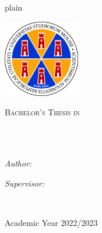 \documentclass[
11pt, %
oneside, %
british, %
doublespacing, %
headsepline,
]{MastersDoctoralThesis} %
\author{Marco \textsc{Omicini}} %
\begin{document}
\renewenvironment{abstract}

\frontmatter %

\pagestyle{plain} %

\begin{titlepage}
	\begin{center}
		\vspace{.06\textheight}
		{\scshape\LARGE \univname\par}\vspace{0.5cm} %
		{\scshape\large \deptname\par}\vspace{1cm} %
		\includegraphics[width=0.25\textwidth]{figs/logo} %
		\vspace{1cm}

		\textsc{\Large Bachelor's Thesis in \degreename}\\[0.5cm] %

		\HRule \\[0.2cm] %
		{\huge \bfseries \ttitle\par}\vspace{0.2cm} %
		\HRule \\[1.5cm] %

		\begin{minipage}[t]{0.4\textwidth}
			\begin{flushleft} \large
				\emph{Author:}\\
				\authorname %
			\end{flushleft}
		\end{minipage}
		\begin{minipage}[t]{0.4\textwidth}
			\begin{flushright} \large
				\emph{Supervisor:} \\
				\supname
			\end{flushright}
		\end{minipage}\\[2cm]
		\centerline{\large \subjectname}
		\smallskip
		{\large Academic Year 2022/2023}\\[2cm] %
		\vfill
	\end{center}
\end{titlepage}
\end{document}
